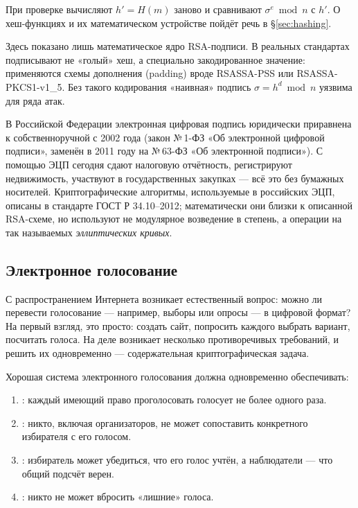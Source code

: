 При проверке вычисляют $h' = H(m)$ заново и сравнивают $\sigma^{e} \bmod n$ с $h'$. О хеш-функциях и их математическом устройстве пойдёт речь в §\ref{sec:hashing}.

\begin{importantbox}[title={Важно: это учебная схема}]
Здесь показано лишь математическое ядро RSA-подписи. В реальных стандартах подписывают не «голый» хеш, а специально закодированное значение: применяются схемы дополнения (padding) вроде RSASSA-PSS или RSASSA-PKCS1-v1\_5. Без такого кодирования «наивная» подпись $\sigma = h^{d} \bmod n$ уязвима для ряда атак.
\end{importantbox}

\begin{interestbox}[title={Это интересно: ЭЦП в России}]
В Российской Федерации электронная цифровая подпись юридически приравнена к собственноручной с 2002 года (закон №\,1-ФЗ «Об электронной цифровой подписи», заменён в 2011 году на №\,63-ФЗ «Об электронной подписи»). С помощью ЭЦП сегодня сдают налоговую отчётность, регистрируют недвижимость, участвуют в государственных закупках --- всё это без бумажных носителей. Криптографические алгоритмы, используемые в российских ЭЦП, описаны в стандарте ГОСТ Р 34.10--2012; математически они близки к описанной RSA-схеме, но используют не модулярное возведение в степень, а операции на так называемых \emph{эллиптических кривых}.
\end{interestbox}

\subsection{Электронное голосование}
\label{subsec:voting}

С распространением Интернета возникает естественный вопрос: можно ли перевести голосование --- например, выборы или опросы --- в цифровой формат? На первый взгляд, это просто: создать сайт, попросить каждого выбрать вариант, посчитать голоса. На деле возникает несколько противоречивых требований, и решить их одновременно --- содержательная криптографическая задача.

\begin{importantbox}[title={Важно: требования к электронному голосованию}]
Хорошая система электронного голосования должна одновременно обеспечивать:
\begin{enumerate}
  \item {}: каждый имеющий право проголосовать голосует не более одного раза.
  \item {}: никто, включая организаторов, не может сопоставить конкретного избирателя с его голосом.
  \item {}: избиратель может убедиться, что его голос учтён, а наблюдатели --- что общий подсчёт верен.
  \item {}: никто не может вбросить «лишние» голоса.
\end{enumerate}
\end{importantbox}

